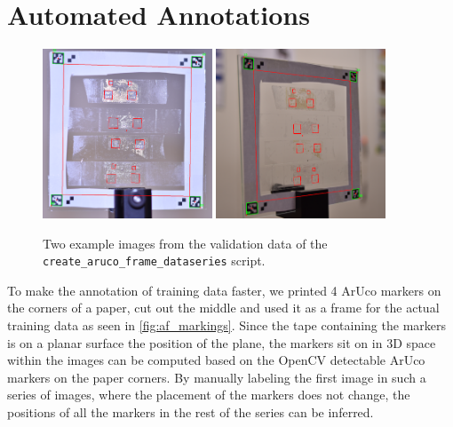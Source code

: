 \documentclass[10pt]{book}
\newcommand{\figureref}[1]{\autoref{#1}}
\begin{document}
\section{Automated Annotations}

\begin{figure}
  \centering
     {\includegraphics[width=0.45\textwidth]{image/af_markings_1}}
     {\includegraphics[width=0.45\textwidth]{image/af_markings_2}}
  \caption{Two example images from the validation data of the \texttt{create\_aruco\_frame\_dataseries} script.}
  \label{fig:af_markings}
\end{figure}

To make the annotation of training data faster, we printed 4 \ac{ArUco} markers on the corners of a paper, cut out the middle and used it as a frame for the actual training data as seen in \figureref{fig:af_markings}. Since the tape containing the markers is on a planar surface the position of the plane, the markers sit on in 3D space within the images can be computed based on the \ac{OpenCV} detectable \ac{ArUco} markers on the paper corners. By manually labeling the first image in such a series of images, where the placement of the markers does not change, the positions of all the markers in the rest of the series can be inferred.
\end{document}
